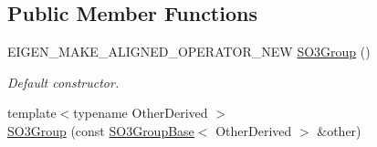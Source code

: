 \subsection*{Public Member Functions}
\begin{DoxyCompactItemize}
\item 
E\+I\+G\+E\+N\+\_\+\+M\+A\+K\+E\+\_\+\+A\+L\+I\+G\+N\+E\+D\+\_\+\+O\+P\+E\+R\+A\+T\+O\+R\+\_\+\+N\+EW \hyperlink{class_sophus_1_1_s_o3_group_a38ce610774b5a87bdb09260d0e8ee22b}{S\+O3\+Group} ()
\begin{DoxyCompactList}\small\item\em Default constructor. \end{DoxyCompactList}\item 
{\footnotesize template$<$typename Other\+Derived $>$ }\\\hyperlink{class_sophus_1_1_s_o3_group_a055e14e8c9ee93718c1570a7ef62447c}{S\+O3\+Group} (const \hyperlink{class_sophus_1_1_s_o3_group_base}{S\+O3\+Group\+Base}$<$ Other\+Derived $>$ \&other)\hypertarget{class_sophus_1_1_s_o3_group_a055e14e8c9ee93718c1570a7ef62447c}{}\label{class_sophus_1_1_s_o3_group_a055e14e8c9ee93718c1570a7ef62447c}


\end{DoxyCompactItemize}
